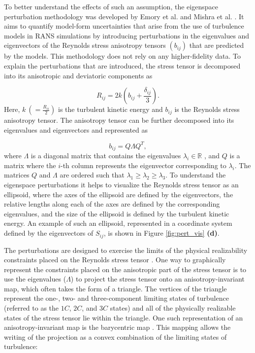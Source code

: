 To better understand the effects of such an assumption, the eigenspace perturbation methodology was developed by Emory et al. \cite{emory2013modeling} and Mishra et al. \cite{iaccarino_eig_pert}. It aims to quantify model-form uncertainties that arise from the use of turbulence models in RANS simulations by introducing perturbations in the eigenvalues and eigenvectors of the Reynolds stress anisotropy tensors $\left ( b_{ij} \right )$ that are predicted by the models. This methodology does not rely on any higher-fidelity data. To explain the perturbations that are introduced, the stress tensor is decomposed into its anisotropic and deviatoric components as
 
\begin{equation}\label{equ:rst_decomp}
    R_{ij}=2k(b_{ij}+\frac{\delta_{ij}}{3}).
\end{equation}
Here, $k~(=\frac{R_{ii}}{2})$ is the turbulent kinetic energy and $b_{ij}$ is the Reynolds stress anisotropy tensor. The anisotropy tensor can be further decomposed into its eigenvalues and eigenvectors and represented as

\begin{equation}\label{equ:eigendecomposition}
b_{ij}=Q \Lambda Q^T,
\end{equation}
where $\Lambda$ is a diagonal matrix that contains the eigenvalues $\lambda_i \in \mathbb{R}$ \cite{Gerolymos2016AlgebraicPA}, and $Q$ is a matrix where the $i$-th column represents the eigenvector corresponding to $\lambda_i$. The matrices $Q$ and $\Lambda$ are ordered such that $\lambda_{1}\geq\lambda_{2}\geq\lambda_{3}$. To understand the eigenspace perturbations it helps to visualize the Reynolds stress tensor as an ellipsoid, where the axes of the ellipsoid are defined by the eigenvectors, the relative lengths along each of the axes are defined by the corresponding eigenvalues, and the size of the ellipsoid is defined by the turbulent kinetic energy. An example of such an ellipsoid, represented in a coordinate system defined by the eigenvectors of $S_{ij}$, is shown in Figure \ref{fig:pert_vis} \textbf{(d)}. 

The perturbations are designed to exercise the limits of the physical realizability constraints placed on the Reynolds stress tensor \cite{schumann1977realizability,speziale1994realizability,2014realizability}. One way to graphically represent the constraints placed on the anisotropic part of the stress tensor is to use the eigenvalues ($\Lambda$) to project the stress tensor onto an anisotropy-invariant map, which often takes the form of a triangle. The vertices of the triangle represent the one-, two- and three-component limiting states of turbulence (referred to as the $1C$, $2C$, and $3C$ states) and all of the physically realizable states of the stress tensor lie within the triangle. One such representation of an anisotropy-invariant map is the barycentric map \cite{banerjee2007presentation}. This mapping allows the writing of the projection as a convex combination of the limiting states of turbulence: 

